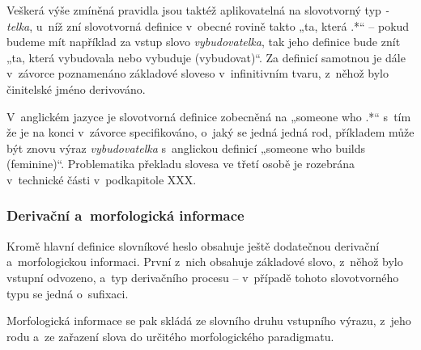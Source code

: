 Veškerá výše zmíněná pravidla jsou taktéž aplikovatelná na slovotvorný
typ \emph{-telka}, u~níž zní slovotvorná definice v~obecné rovině takto
„ta, která .*`` -- pokud budeme mít například za vstup slovo
\emph{vybudovatelka}, tak jeho definice bude znít „ta, která vybudovala
nebo vybuduje (vybudovat)``. Za definicí samotnou je dále v~závorce
poznamenáno základové sloveso v~infinitivním tvaru, z~něhož bylo
činitelské jméno derivováno.

V~anglickém jazyce je slovotvorná definice zobecněná na „someone who
.*`` s~tím že je na konci v~závorce specifikováno, o~jaký se jedná jedná
rod, příkladem může být znovu výraz \emph{vybudovatelka} s~anglickou
definicí „someone who builds (feminine)``. Problematika překladu slovesa
ve třetí osobě je rozebrána v~technické části v~podkapitole XXX.

\hypertarget{derivaux10dnuxed-a-morfologickuxe1-informace}{%
\subsubsection{Derivační a~morfologická
informace}\label{derivaux10dnuxed-a-morfologickuxe1-informace}}

Kromě hlavní definice slovníkové heslo obsahuje ještě dodatečnou
derivační a~morfologickou informaci. První z~nich obsahuje základové
slovo, z~něhož bylo vstupní odvozeno, a~typ derivačního procesu --
v~případě tohoto slovotvorného typu se jedná o~sufixaci.

Morfologická informace se pak skládá ze slovního druhu vstupního výrazu,
z~jeho rodu a~ze zařazení slova do určitého morfologického paradigmatu.
